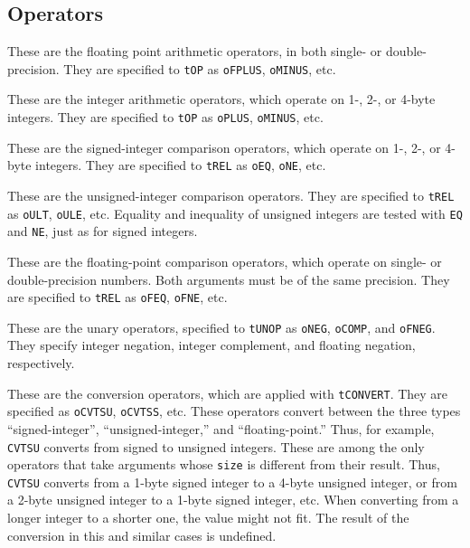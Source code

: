 \subsection{Operators}

\begin{production}

These are the floating point arithmetic operators,
in both single- or double-precision.
They are specified to \verb|tOP| as \verb|oFPLUS|, \verb|oMINUS|, etc.


These are the integer arithmetic operators, which operate on 1-, 2-, or
4-byte integers. They are specified to \verb|tOP| as \verb|oPLUS|, \verb|oMINUS|, etc. 


These are the signed-integer comparison operators, which operate on 1-, 2-, or
4-byte integers. They are specified to \verb|tREL| as \verb|oEQ|, \verb|oNE|, etc. 


These are the unsigned-integer comparison operators.
They are specified to \verb|tREL| as \verb|oULT|, \verb|oULE|, etc.
Equality and inequality
of unsigned integers are tested with \verb|EQ| and \verb|NE|, just as for signed integers.
 

These are the floating-point comparison operators, which operate on single-
or double-precision numbers.
Both arguments must be of the same precision.
They are specified to \verb|tREL| as \verb|oFEQ|, \verb|oFNE|, etc. 


These are the unary operators, specified to \verb|tUNOP| as \verb|oNEG|, \verb|oCOMP|,
and \verb|oFNEG|. They specify integer negation, integer complement,
and floating negation, respectively.


These are the conversion operators, which are applied with
\verb|tCONVERT|. They are specified as \verb|oCVTSU|, \verb|oCVTSS|, etc. 
These operators convert between the three types ``signed-integer'',
``unsigned-integer,'' and ``floating-point.''
Thus, for example, \verb|CVTSU| converts from signed to unsigned integers.
These are among the only operators that take arguments whose
\verb|size| is different from their result. Thus, \verb|CVTSU| converts
from a 1-byte signed integer to a 4-byte unsigned integer, or from
a 2-byte unsigned integer to a 1-byte signed integer, etc.
When converting from a longer integer to a shorter one,
the value might not fit.
The result of the conversion in this and similar cases is undefined.
\end{production}

